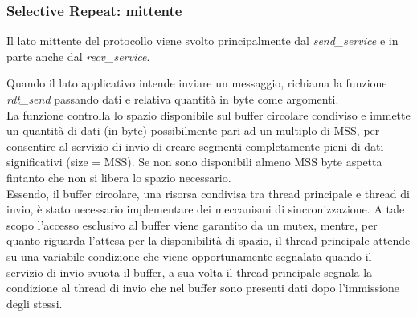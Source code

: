 \subsubsection{Selective Repeat: mittente}
Il lato mittente del protocollo viene svolto principalmente dal 
\emph{send\_service} e in parte anche dal \emph{recv\_service}.

Quando il lato applicativo intende inviare un messaggio, richiama la funzione
\emph{rdt\_send} passando dati e relativa quantità in byte come argomenti.\\
La funzione controlla lo spazio disponibile sul buffer circolare condiviso
e immette un quantità di dati (in byte) possibilmente pari ad un multiplo di 
MSS, per consentire al servizio di invio di creare segmenti completamente pieni 
di dati significativi (size = MSS). Se non sono disponibili almeno MSS byte 
aspetta fintanto che non si libera lo spazio necessario.\\
Essendo, il buffer circolare, una risorsa condivisa tra thread principale e 
thread di invio, è stato necessario implementare dei meccanismi di 
sincronizzazione.
A tale scopo l'accesso esclusivo al buffer viene garantito da un mutex,
mentre, per quanto riguarda l'attesa per la disponibilità di spazio, il thread
principale attende su una variabile condizione che viene opportunamente segnalata
quando il servizio di invio svuota il buffer, a sua volta il thread principale
segnala la condizione al thread di invio che nel buffer sono presenti dati dopo
l'immissione degli stessi.

